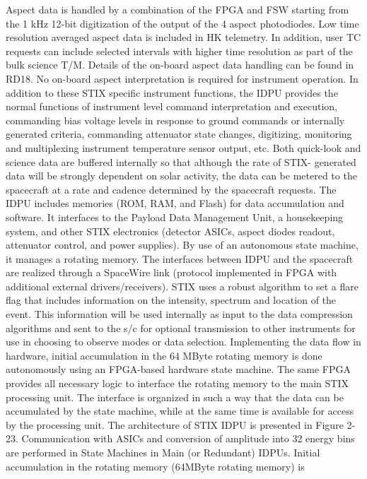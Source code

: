 \documentclass{aa}
\begin{document}
 Aspect data is handled by a combination of the FPGA and FSW starting from the 1 kHz 12-bit
digitization of the output of the 4 aspect photodiodes. Low time resolution averaged aspect
data is included in HK telemetry. In addition, user TC requests can include selected intervals
with higher time resolution as part of the bulk science T/M. Details of the on-board aspect
data handling can be found in RD18. No on-board aspect interpretation is required for
instrument operation.
In addition to these STIX specific instrument functions, the IDPU provides the normal functions
of instrument level command interpretation and execution, commanding bias voltage levels in
response to ground commands or internally generated criteria, commanding attenuator state
changes, digitizing, monitoring and multiplexing instrument temperature sensor output, etc.
Both quick-look and science data are buffered internally so that although the rate of STIX-
generated data will be strongly dependent on solar activity, the data can be metered to the
spacecraft at a rate and cadence determined by the spacecraft requests.
The IDPU includes memories (ROM, RAM, and Flash) for data accumulation and software. It
interfaces to the Payload Data Management Unit, a housekeeping system, and other STIX
electronics (detector ASICs, aspect diodes readout, attenuator control, and power supplies).
By use of an autonomous state machine, it manages a rotating memory. The interfaces
between IDPU and the spacecraft are realized through a SpaceWire link (protocol
implemented in FPGA with additional external drivers/receivers).
STIX uses a robust algorithm to set a flare flag that includes information on the intensity,
spectrum and location of the event. This information will be used internally as input to the data
compression algorithms and sent to the s/c for optional transmission to other instruments for
use in choosing to observe modes or data selection.
Implementing the data flow in hardware, initial accumulation in the 64 MByte rotating memory
is done autonomously using an FPGA-based hardware state machine. The same FPGA
provides all necessary logic to interface the rotating memory to the main STIX processing unit.
The interface is organized in such a way that the data can be accumulated by the state
machine, while at the same time is available for access by the processing unit.
The architecture of STIX IDPU is presented in Figure 2-23. Communication with ASICs and
conversion of amplitude into 32 energy bins are performed in State Machines in Main (or
Redundant) IDPUs. Initial accumulation in the rotating memory (64MByte rotating memory) is
\end{document}
